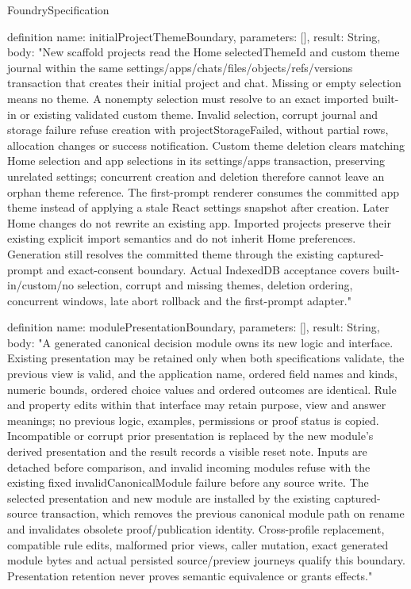 \begin{lexlean}{FoundrySpecification}
\begin{semanticmodule}
definition{
  name: initialProjectThemeBoundary,
  parameters: [],
  result: String,
  body: "New scaffold projects read the Home selectedThemeId and custom theme journal within the same settings/apps/chats/files/objects/refs/versions transaction that creates their initial project and chat. Missing or empty selection means no theme. A nonempty selection must resolve to an exact imported built-in or existing validated custom theme. Invalid selection, corrupt journal and storage failure refuse creation with projectStorageFailed, without partial rows, allocation changes or success notification. Custom theme deletion clears matching Home selection and app selections in its settings/apps transaction, preserving unrelated settings; concurrent creation and deletion therefore cannot leave an orphan theme reference. The first-prompt renderer consumes the committed app theme instead of applying a stale React settings snapshot after creation. Later Home changes do not rewrite an existing app. Imported projects preserve their existing explicit import semantics and do not inherit Home preferences. Generation still resolves the committed theme through the existing captured-prompt and exact-consent boundary. Actual IndexedDB acceptance covers built-in/custom/no selection, corrupt and missing themes, deletion ordering, concurrent windows, late abort rollback and the first-prompt adapter."
}

definition{
  name: modulePresentationBoundary,
  parameters: [],
  result: String,
  body: "A generated canonical decision module owns its new logic and interface. Existing presentation may be retained only when both specifications validate, the previous view is valid, and the application name, ordered field names and kinds, numeric bounds, ordered choice values and ordered outcomes are identical. Rule and property edits within that interface may retain purpose, view and answer meanings; no previous logic, examples, permissions or proof status is copied. Incompatible or corrupt prior presentation is replaced by the new module's derived presentation and the result records a visible reset note. Inputs are detached before comparison, and invalid incoming modules refuse with the existing fixed invalidCanonicalModule failure before any source write. The selected presentation and new module are installed by the existing captured-source transaction, which removes the previous canonical module path on rename and invalidates obsolete proof/publication identity. Cross-profile replacement, compatible rule edits, malformed prior views, caller mutation, exact generated module bytes and actual persisted source/preview journeys qualify this boundary. Presentation retention never proves semantic equivalence or grants effects."
}


\end{semanticmodule}
\end{lexlean}
